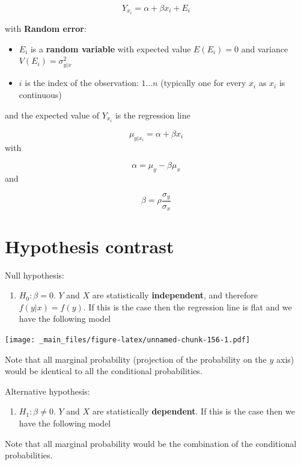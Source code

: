 \documentclass[
]{book}
\providecommand{\tightlist}{%
  \setlength{\itemsep}{0pt}\setlength{\parskip}{0pt}}
\begin{document}
\[Y_{x_i} = \alpha + \beta x_i +E_{i}\]

with \textbf{Random error}:

\begin{itemize}
\item
  \(E_{i}\) is a \textbf{random variable} with expected value \(E(E_{i})=0\) and variance \(V(E_{i})=\sigma_{y|x}^2\)
\item
  \(i\) is the index of the observation: \(1...n\) (typically one for every \(x_i\) as \(x_i\) is continuous)
\end{itemize}

and the expected value of \(Y_{x_i}\) is the regression line

\[\mu_{y|x_i}=\alpha + \beta x_i\]
with

\[\alpha=\mu_y-\beta\mu_x\]
and

\[\beta=\rho\frac{\sigma_y}{\sigma_x}\]

\hypertarget{hypothesis-contrast-1}{%
\section{Hypothesis contrast}\label{hypothesis-contrast-1}}

Null hypothesis:

\begin{enumerate}
\def\labelenumi{\alph{enumi}.}
\tightlist
\item
  \(H_0: \beta=0\). \(Y\) and \(X\) are statistically \textbf{independent}, and therefore \(f(y|x)=f(y)\). If this is the case then the regression line is flat and we have the following model
\end{enumerate}

\texttt{[image: \_main\_files/figure-latex/unnamed-chunk-156-1.pdf]}

Note that all marginal probability (projection of the probability on the \(y\) axis) would be identical to all the conditional probabilities.

Alternative hypothesis:

\begin{enumerate}
\def\labelenumi{\alph{enumi}.}
\setcounter{enumi}{1}
\tightlist
\item
  \(H_1: \beta\neq 0\). \(Y\) and \(X\) are statistically \textbf{dependent}. If this is the case then we have the following model
\end{enumerate}

Note that all marginal probability would be the combination of the conditional probabilities.
\end{document}
